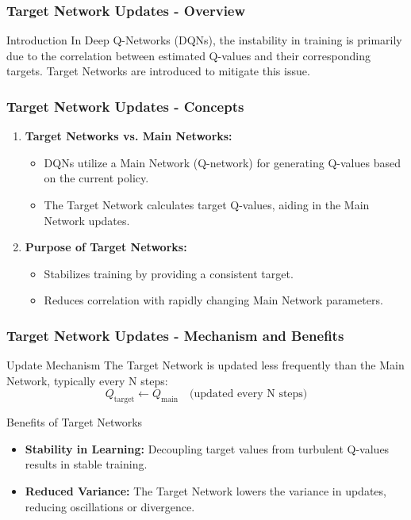 \documentclass[aspectratio=169]{beamer}
\begin{document}
\begin{frame}[fragile]
    \frametitle{Target Network Updates - Overview}
    \begin{block}{Introduction}
        In Deep Q-Networks (DQNs), the instability in training is primarily due to the correlation between estimated Q-values and their corresponding targets. Target Networks are introduced to mitigate this issue.
    \end{block}
\end{frame}

\begin{frame}[fragile]
    \frametitle{Target Network Updates - Concepts}
    \begin{enumerate}
        \item \textbf{Target Networks vs. Main Networks:}
        \begin{itemize}
            \item DQNs utilize a Main Network (Q-network) for generating Q-values based on the current policy.
            \item The Target Network calculates target Q-values, aiding in the Main Network updates.
        \end{itemize}
        
        \item \textbf{Purpose of Target Networks:}
        \begin{itemize}
            \item Stabilizes training by providing a consistent target.
            \item Reduces correlation with rapidly changing Main Network parameters.
        \end{itemize}
    \end{enumerate}
\end{frame}

\begin{frame}[fragile]
    \frametitle{Target Network Updates - Mechanism and Benefits}
    \begin{block}{Update Mechanism}
        The Target Network is updated less frequently than the Main Network, typically every N steps:
        \begin{equation}
            Q_{\text{target}} \leftarrow Q_{\text{main}} \quad \text{(updated every N steps)}
        \end{equation}
    \end{block}

    \begin{block}{Benefits of Target Networks}
        \begin{itemize}
            \item \textbf{Stability in Learning:} Decoupling target values from turbulent Q-values results in stable training.
            \item \textbf{Reduced Variance:} The Target Network lowers the variance in updates, reducing oscillations or divergence.
        \end{itemize}
    \end{block}
\end{frame}
\end{document}
